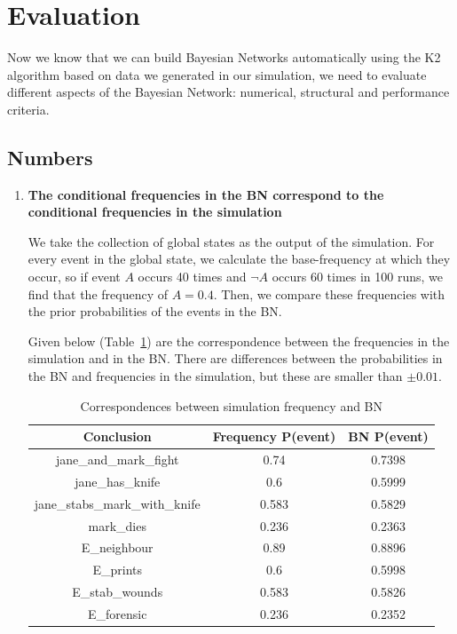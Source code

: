 \section{Evaluation}

Now we know that we can build Bayesian Networks automatically using the K2 algorithm based on data we generated in our simulation, we need to evaluate different aspects of the Bayesian Network: numerical, structural and performance criteria.


\subsection{Numbers}
\begin{enumerate}
\item \textbf{The conditional frequencies in the BN correspond to the conditional frequencies in the simulation}

We take the collection of global states as the output of the simulation. For every event in the global state, we calculate the base-frequency at which they occur, so if event $A$ occurs 40 times and $\neg A$ occurs 60 times in 100 runs, we find that the frequency of $A = 0.4$. Then, we compare these frequencies with the prior probabilities of the events in the BN.

Given below (Table~\ref{kids}) are the correspondence between the frequencies in the simulation and in the BN. There are differences between the probabilities in the BN and frequencies in the simulation, but these are smaller than $±0.01$.


\begin{table}[htbp]
\centering
\begin{tabular}{|c|c|c|}
 \hline
 Conclusion & Frequency P(event) & BN P(event)\\
 \hline
jane\_and\_mark\_fight & 0.74 & 0.7398 \\
jane\_has\_knife & 0.6 & 0.5999 \\
jane\_stabs\_mark\_with\_knife & 0.583 & 0.5829 \\
mark\_dies & 0.236 & 0.2363 \\
E\_neighbour & 0.89 & 0.8896 \\
E\_prints & 0.6 & 0.5998 \\
E\_stab\_wounds & 0.583 & 0.5826 \\
E\_forensic & 0.236 & 0.2352\\
\hline
\end{tabular}
\caption{Correspondences between simulation frequency and BN}
\label{kids}
\end{table}




\end{enumerate}
